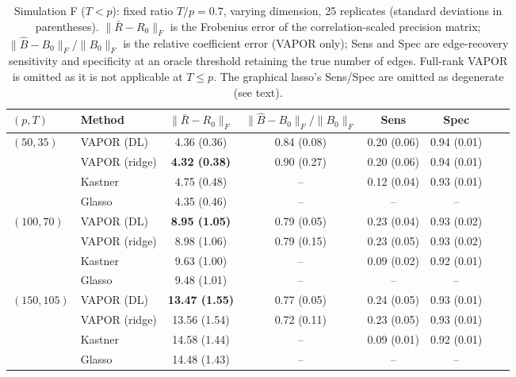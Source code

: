 \begin{table}[h!]
\centering
\caption{Simulation F ($T<p$): fixed ratio $T/p=0.7$, varying dimension, 25 replicates (standard deviations in parentheses). $\|\bar R-R_0\|_F$ is the Frobenius error of the correlation-scaled precision matrix; $\|\hat B-B_0\|_F/\|B_0\|_F$ is the relative coefficient error (VAPOR only); Sens and Spec are edge-recovery sensitivity and specificity at an oracle threshold retaining the true number of edges. Full-rank VAPOR is omitted as it is not applicable at $T\le p$. The graphical lasso's Sens/Spec are omitted as degenerate (see text).}
\label{tab:sim-f}
\centering
\small
\begin{tabular}{llcccccc}
\toprule
$(p,T)$ & Method & $\|\bar R-R_0\|_F$ & $\|\hat B-B_0\|_F/\|B_0\|_F$ & Sens & Spec \\
\midrule
\multirow{4}{*}{$(50,35)$}
  & VAPOR (DL)    & 4.36 (0.36) & 0.84 (0.08) & 0.20 (0.06) & 0.94 (0.01)\\
  & VAPOR (ridge) & \textbf{4.32 (0.38)} & 0.90 (0.27) & 0.20 (0.06) & 0.94 (0.01)\\
  & Kastner       & 4.75 (0.48) & --          & 0.12 (0.04) & 0.93 (0.01)\\
  & Glasso        & 4.35 (0.46) & --          & --          & --\\
\midrule
\multirow{4}{*}{$(100,70)$}
  & VAPOR (DL)    & \textbf{8.95 (1.05)} & 0.79 (0.05) & 0.23 (0.04) & 0.93 (0.02)\\
  & VAPOR (ridge) & 8.98 (1.06) & 0.79 (0.15) & 0.23 (0.05) & 0.93 (0.02)\\
  & Kastner       & 9.63 (1.00) & --          & 0.09 (0.02) & 0.92 (0.01)\\
  & Glasso        & 9.48 (1.01) & --          & --          & --\\
\midrule
\multirow{4}{*}{$(150,105)$}
  & VAPOR (DL)    & \textbf{13.47 (1.55)} & 0.77 (0.05) & 0.24 (0.05) & 0.93 (0.01)\\
  & VAPOR (ridge) & 13.56 (1.54) & 0.72 (0.11) & 0.23 (0.05) & 0.93 (0.01)\\
  & Kastner       & 14.58 (1.44) & --          & 0.09 (0.01) & 0.92 (0.01)\\
  & Glasso        & 14.48 (1.43) & --          & --          & --\\
\bottomrule
\end{tabular}
\end{table}

